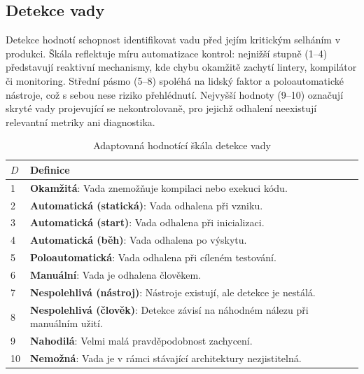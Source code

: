 \documentclass[FM,DP,fonts]{tulthesis}
\renewcommand{\arraystretch}{1.2}
\begin{document}
\subsection{Detekce vady}
Detekce hodnotí schopnost identifikovat vadu před jejím kritickým selháním v produkci. Škála reflektuje míru automatizace kontrol: nejnižší stupně (1–4) představují reaktivní mechanismy, kde chybu okamžitě zachytí lintery, kompilátor či monitoring. Střední pásmo (5–8) spoléhá na lidský faktor a poloautomatické nástroje, což s sebou nese riziko přehlédnutí. Nejvyšší hodnoty (9–10) označují skryté vady projevující se nekontrolovaně, pro jejichž odhalení neexistují relevantní metriky ani diagnostika.

\begin{table}[p]
	\centering
	\caption{Adaptovaná hodnotící škála detekce vady}
	\renewcommand{\arraystretch}{1.5}
	\begin{tabularx}{\textwidth}{|l|X|}
		\hline
		$D$ & \textbf{Definice}                                                                      \\ \hline
		1   & \textbf{Okamžitá}: Vada znemožňuje kompilaci nebo exekuci kódu.                        \\ \hline
		2   & \textbf{Automatická (statická)}: Vada odhalena při vzniku.                             \\ \hline
		3   & \textbf{Automatická (start)}: Vada odhalena při inicializaci.                          \\ \hline
		4   & \textbf{Automatická (běh)}: Vada odhalena po výskytu.                                  \\ \hline
		5   & \textbf{Poloautomatická}: Vada odhalena při cíleném testování.                         \\ \hline
		6   & \textbf{Manuální}: Vada je odhalena člověkem.                                          \\ \hline
		7   & \textbf{Nespolehlivá (nástroj)}: Nástroje existují, ale detekce je nestálá.            \\ \hline
		8   & \textbf{Nespolehlivá (člověk)}: Detekce závisí na náhodném nálezu při manuálním užití. \\ \hline
		9   & \textbf{Nahodilá}: Velmi malá pravděpodobnost zachycení.                               \\ \hline
		10  & \textbf{Nemožná}: Vada je v rámci stávající architektury nezjistitelná.                \\ \hline
	\end{tabularx}
\end{table}
\end{document}
